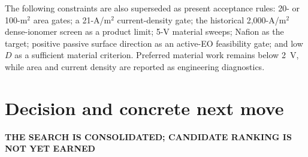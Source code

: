 \documentclass[10pt,a4paper]{article}
\newcommand{\eyebrow}[1]{{\sffamily\bfseries\small\color{Teal}\MakeUppercase{#1}}}
\begin{document}
The following constraints are also superseded as present acceptance rules:
20- or 100-m$^2$ area gates; a 21-A/m$^2$ current-density gate; the historical
2,000-A/m$^2$ dense-ionomer screen as a product limit; 5-V material sweeps;
Nafion as the target; positive passive surface direction as an active-EO
feasibility gate; and low $D$ as a sufficient material criterion. Preferred
material work remains below 2~V, while area and current density are reported as
engineering diagnostics.

\section{Decision and concrete next move}
\eyebrow{The search is consolidated; candidate ranking is not yet earned}
\end{document}
